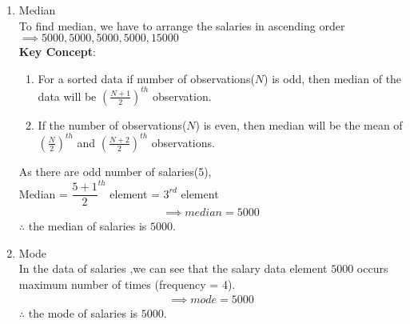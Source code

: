 \documentclass[journal,12pt, two column]{IEEEtran}
\providecommand{\brak}[1]{\ensuremath{\left(#1\right)}}
\begin{document}
\begin{enumerate}[label=(\roman*)]
\item
Median\\
To find median, we have to arrange the salaries in ascending order \\
$\implies 5000, 5000, 5000, 5000, 15000$ \\
 \textbf{Key Concept}: 
\begin{enumerate}
\item For a sorted data if number of observations($N$) is odd, then median of the data will be $\brak{\frac{N + 1}{2}}^{th}$ observation.
\item If the number of observations($N$) is even, then median will be the mean of $\brak{\frac{N}{2}}^{th}$ and $\brak{\frac{N+2}{2}}^{th}$ observations.
\end{enumerate}
As there are odd number of salaries(5),\\
Median = $\dfrac{5+1}{2}^{th}$ element = $3^{rd}$ element
\begin{align}
\implies median = 5000\nonumber
\end{align}
$\therefore$ the median of salaries is \rupee$5000$.

\item
Mode\\
In the data of salaries ,we can see that the salary data element $5000$ occurs maximum number of times (frequency = 4).
\begin{align}
  \implies mode=5000\nonumber
\end{align}
$\therefore$ the mode of salaries is \rupee$5000$.

\end{enumerate}
\end{document}
